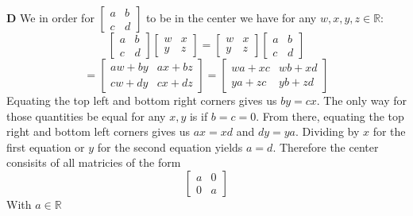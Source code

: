 \documentclass[12pt]{article}
\newenvironment{ques}{\vspace{2 ex}}{\vspace{2 ex}}
\theoremstyle{definition}
\begin{document}
\begin{ques}
	\textbf{D}
	We in order for $\left[\begin{array}{cc} a & b \\ c & d
	\end{array}\right]$ to be in the center we have for any $w,x,y,z
	\in \mathbb R$:
	$$\left[\begin{array}{cc} a & b \\ c &
	d \end{array}\right]\left[\begin{array}{cc} w &
	x \\ y & z \end{array}\right] =
	\left[\begin{array}{cc} w & x \\ y & z
	\end{array}\right]\left[\begin{array}{cc}
	a & b \\ c & d \end{array}\right]$$
	$$= \left[\begin{array}{cc} aw + by & ax + bz
	\\ cw + dy & cx + dz \end{array}\right] =
	\left[\begin{array}{cc} wa + xc & wb + xd
	\\ ya + zc & yb + zd \end{array}\right] $$
	Equating the top left and bottom right corners gives us $by =
	cx$. The only way for those quantities be equal for any $x,y$ is if
	$b= c= 0$. From there, equating the top right and bottom left
	corners gives us $ax = xd$ and $dy = ya$. Dividing by $x$ for
	the first equation or $y$ for the second equation yields $a =
	d$. Therefore the center consisits of all matricies of the form
	$$\left[ \begin{array}{cc} a & 0 \\ 0 & a \end{array} \right]$$
	With $a \in \mathbb R$
\end{ques}
\end{document}
